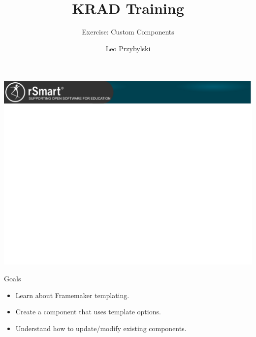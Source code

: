 \documentclass[xcolor=dvipsnames,14pt,professionalfonts]{beamer}
\begin{document}
\title{KRAD Training}
\subtitle{Exercise: Custom Components}
\author[Leo]{Leo Przybylski}

\usebackgroundtemplate%
{%
    \includegraphics[width=\paperwidth,height=\paperheight]{../img/header.png}%
}

{
%
\begin{frame}[plain]
  \titlepage
\end{frame}
}

\begin{frame}{Goals}
  \begin{itemize}
    \item Learn about Framemaker templating.
    \item Create a component that uses template options.
    \item Understand how to update/modify existing components.
  \end{itemize}
\end{frame}
\end{document}
